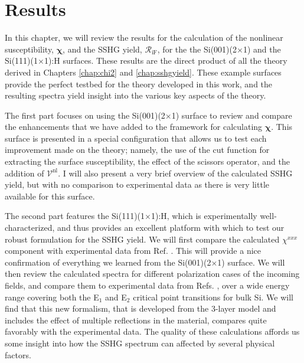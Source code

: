 \chapter{Results}\label{chap:results}
\partialtoc

In this chapter, we will review the results for the calculation of the nonlinear
susceptibility, $\boldsymbol{\chi}$, and the SSHG yield,
$\mathcal{R}_{\mathrm{iF}}$, for the the Si(001)(2$\times$1) and the
Si(111)(1$\times$1):H surfaces. These results are the direct product of all the
theory derived in Chapters \ref{chap:chi2} and \ref{chap:sshgyield}. These
example surfaces provide the perfect testbed for the theory developed in this
work, and the resulting spectra yield insight into the various key aspects of
the theory.

The first part focuses on using the Si(001)(2$\times$1) surface to review and
compare the enhancements that we have added to the framework for calculating
$\boldsymbol{\chi}$. This surface is presented in a special configuration that
allows us to test each improvement made on the theory; namely, the use of the
cut function for extracting the surface susceptibility, the effect of the
scissors operator, and the addition of $\boldsymbol{\mathcal{V}}^{\mathrm{nl}}$.
I will also present a very brief overview of the calculated SSHG yield, but with
no comparison to experimental data as there is very little available for this
surface.

The second part features the Si(111)(1$\times$1):H, which is experimentally
well-characterized, and thus provides an excellent platform with which to test
our robust formulation for the SSHG yield. We will first compare the calculated
$\chi^{xxx}$ component with experimental data from Ref. \cite{hoferAPA96}. This
will provide a nice confirmation of everything we learned from the
Si(001)(2$\times$1) surface. We will then review the calculated spectra for
different polarization cases of the incoming fields, and compare them to
experimental data from Refs. \cite{bergfeldPRL04, mejiaPRB02, mitchellSS01},
over a wide energy range covering both the E$_{1}$ and E$_{2}$ critical point
transitions for bulk Si. We will find that this new formalism, that is developed
from the 3-layer model and includes the effect of multiple reflections in the
material, compares quite favorably with the experimental data. The quality of
these calculations affords us some insight into how the SSHG spectrum can
affected by several physical factors.


